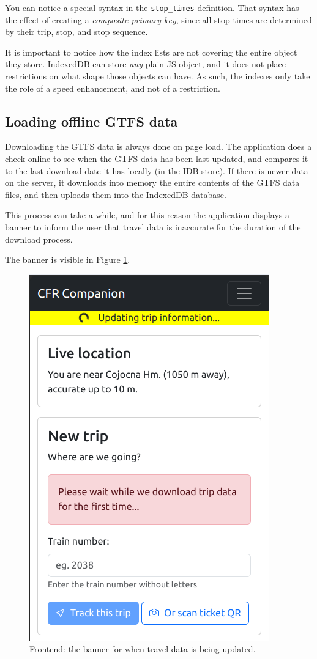You can notice a special syntax in the \verb|stop_times| definition. That syntax has the effect of creating a \textit{composite primary key}, since all stop times are determined by their trip, stop, and stop sequence.

It is important to notice how the index lists are not covering the entire object they store. IndexedDB can store \textit{any} plain JS object, and it does not place restrictions on what shape those objects can have. As such, the indexes only take the role of a speed enhancement, and not of a restriction.

\subsection{Loading offline GTFS data}
Downloading the GTFS data is always done on page load. The application does a check online to see when the GTFS data has been last updated, and compares it to the last download date it has locally (in the IDB store). If there is newer data on the server, it downloads into memory the entire contents of the GTFS data files, and then uploads them into the IndexedDB database.

This process can take a while, and for this reason the application displays a banner to inform the user that travel data is inaccurate for the duration of the download process.

The banner is visible in Figure \ref{FigFeUpdateBanner}.

\begin{figure}[htbp]
    \centering
    \includegraphics[width=.6\textwidth]{./figures/code/fe_update-banner.png}
    \caption{Frontend: the banner for when travel data is being updated.}
    \label{FigFeUpdateBanner}
\end{figure}

